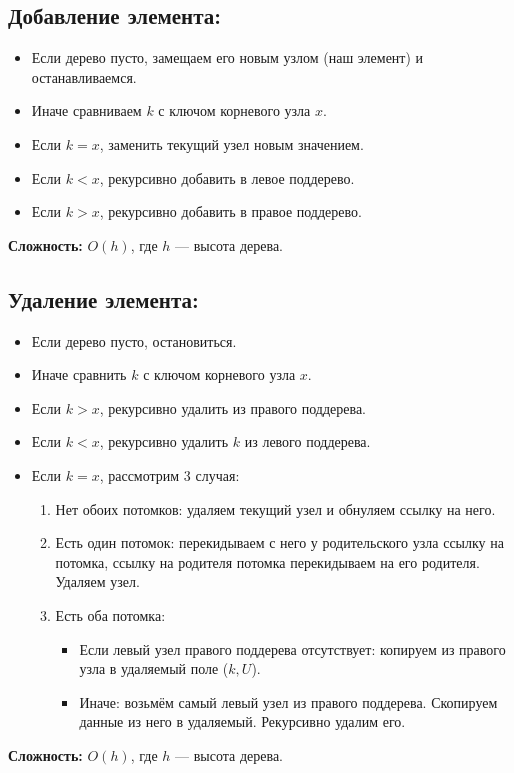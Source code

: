 \subsection*{Добавление элемента:}
\begin{itemize}
	\item Если дерево пусто, замещаем его новым узлом (наш элемент) и останавливаемся.
	\item Иначе сравниваем $k$ с ключом корневого узла $x$.
	\item Если $k=x$, заменить текущий узел новым значением.
	\item Если $k<x$, рекурсивно добавить в левое поддерево.
	\item Если $k>x$, рекурсивно добавить в правое поддерево.
\end{itemize}
\textbf{Сложность:} $O(h)$, где $h$ --- высота дерева.

\subsection*{Удаление элемента:}
\begin{itemize}
	\item Если дерево пусто, остановиться.
	\item Иначе сравнить $k$ с ключом корневого узла $x$.
	\item Если $k>x$, рекурсивно удалить из правого поддерева.
	\item Если $k<x$, рекурсивно удалить $k$ из левого поддерева.
	\item Если $k=x$, рассмотрим 3 случая:
	\begin{enumerate}
		\item Нет обоих потомков: удаляем текущий узел и обнуляем ссылку на него.
		\item Есть один потомок: перекидываем с него у родительского узла ссылку на потомка, ссылку на родителя потомка перекидываем на его родителя. Удаляем узел.
		\item Есть оба потомка:
		\begin{itemize}
			\item Если левый узел правого поддерева отсутствует: копируем из правого узла в удаляемый поле ($k,U$).
			\item Иначе: возьмём самый левый узел из правого поддерева. Скопируем данные из него в удаляемый. Рекурсивно удалим его.
		\end{itemize}
	\end{enumerate}
\end{itemize}
\textbf{Сложность:} $O(h)$, где $h$ --- высота дерева.